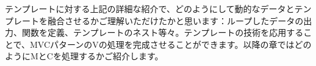 テンプレートに対する上記の詳細な紹介で、どのようにして動的なデータとテンプレートを融合させるかご理解いただけたかと思います：ループしたデータの出力、関数を定義、テンプレートのネスト等々。テンプレートの技術を応用することで、MVCパターンのVの処理を完成させることができます。以降の章ではどのようにMとCを処理するかご紹介します。
